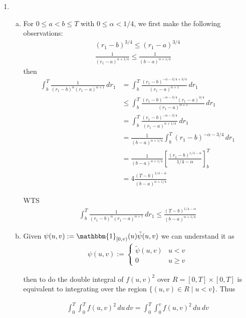 \documentclass[a4paper,12pt]{article}
\theoremstyle{definition}
\begin{document}
\begin{enumerate}
\item
\begin{enumerate}[(a)]
\item For $0 \leq a < b \leq T$ with $0 \leq \alpha < 1/4$, we first make the following observations:
\begin{align}
(r_1-b)^{3/4} \leq (r_1-a)^{3/4}\\
\frac{1}{(r_1-a)^{\alpha+1/4}} \leq \frac{1}{(b-a)^{\alpha+1/4}}
\end{align}
then
\begin{align*}
\int_{b}^{T}\frac{1}{(r_1-b)^\alpha(r_1-a)^{\alpha+1}}\,dr_1 &= \int_{b}^{T}\frac{(r_1-b)^{-\alpha-3/4+3/4}}{(r_1-a)^{\alpha+1}}\,dr_1\\
&\leq \int_{b}^{T}\frac{(r_1-b)^{-\alpha-3/4}(r_1-a)^{3/4}}{(r_1-a)^{\alpha+1}}\,dr_1\\
&= \int_{b}^{T}\frac{(r_1-b)^{-\alpha-3/4}}{(r_1-a)^{\alpha+1/4}}\,dr_1\\
&= \frac{1}{(b-a)^{\alpha+1/4}}\int_{b}^{T}(r_1-b)^{-\alpha-3/4}\,dr_1\\
&= \frac{1}{(b-a)^{\alpha+1/4}}\left[\frac{(r_1-b)^{1/4-\alpha}}{1/4-\alpha}\right]_{b}^{T}\\
&= 4\frac{(T-b)^{1/4-\alpha}}{(b-a)^{\alpha+1/4}}
\end{align*}

WTS
\begin{align*}
\int_{b}^{T}\frac{1}{(r_1-b)^\alpha(r_1-a)^{\alpha+1}}\,dr_1 \leq \frac{(T-b)^{1/4-\alpha}}{(b-a)^{\alpha+1/4}}
\end{align*}

\item 
Given $\psi(u,v):= \mathbbm{1}_{[0,v)}(u)\tilde{\psi}(u,v)$ we can understand it as
\begin{align*}
\psi(u,v):=\begin{cases}
\tilde{\psi}(u,v) & u <v\\
0 & u \geq v
\end{cases}
\end{align*}

then to do the double integral of $f(u,v)^2$ over $R = [0,T] \times [0,T]$ is equivalent to integrating over the region $\{(u,v) \in R\mid u < v\}$. Thus 

\begin{align*}
\int_{0}^{T}\int_{0}^{T}f(u,v)^2\,du\,dv = \int_{0}^{T} \int_{0}^{v}f(u,v)^2\,du\,dv
\end{align*}

\end{enumerate}


\end{enumerate}
\end{document}
